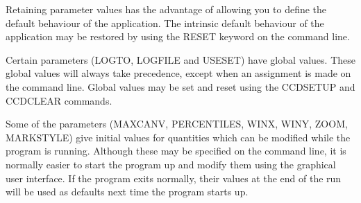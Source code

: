 \documentclass[twoside,11pt]{article}
\renewcommand{\_}{\texttt{\symbol{95}}}
\begin{document}
{{      Retaining parameter values has the advantage of allowing you to
      define the default behaviour of the application.  The intrinsic
      default behaviour of the application may be restored by using the
      RESET keyword on the command line.

      Certain parameters (LOGTO, LOGFILE and USESET) have global values.
      These global values will always take precedence, except when an
      assignment is made on the command line.  Global values may be set
      and reset using the CCDSETUP and CCDCLEAR commands.

      Some of the parameters (MAXCANV, PERCENTILES, WINX, WINY, ZOOM,
      MARKSTYLE) give initial values for quantities which can be modified
      while the program is running.  Although these may be specified on
      the command line, it is normally easier to start the program up and
      modify them using the graphical user interface.  If the program
      exits normally, their values at the end of the run will be used
      as defaults next time the program starts up.
   }
}
\end{document}
